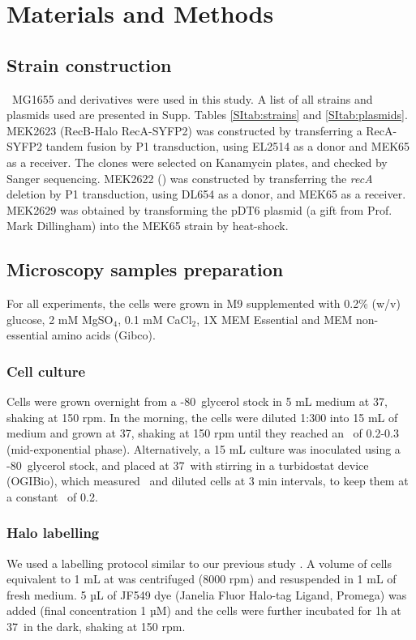 \section*{Materials and Methods}

\subsection*{Strain construction}
\ecoli\ MG1655 and derivatives were used in this study. A list of all strains and plasmids used are presented in Supp. Tables \ref{SItab:strains} and \ref{SItab:plasmids}.
MEK2623 (RecB-Halo RecA-SYFP2) was constructed by transferring a RecA-SYFP2 tandem fusion by P1 transduction, using EL2514 \cite{Wiktor2021} as a donor and MEK65 \cite{Lepore2019a} as a receiver. The clones were selected on Kanamycin plates, and checked by Sanger sequencing. MEK2622 (\dreca) was constructed by transferring the \emph{recA} deletion by P1 transduction, using DL654 as a donor, and MEK65 as a receiver. MEK2629 was obtained by transforming the pDT6 plasmid (a gift from Prof. Mark Dillingham) into the MEK65 strain by heat-shock.

\subsection*{Microscopy samples preparation}
For all experiments, the cells were grown in M9 supplemented with 0.2\% (w/v) glucose, 2 mM MgSO$_4$, 0.1 mM CaCl$_2$, 1X MEM Essential and MEM non-essential amino acids (Gibco).
\subsubsection*{Cell culture}
Cells were grown overnight from a -80\celsius\ glycerol stock in 5 mL medium at 37\celsius, shaking at 150 rpm. In the morning, the cells were diluted 1:300 into 15 mL of medium and grown at 37\celsius, shaking at 150 rpm until they reached an \od\ of 0.2-0.3 (mid-exponential phase).
Alternatively, a 15 mL culture was inoculated using a -80\celsius\ glycerol stock, and placed at 37\celsius\ with stirring in a turbidostat device (OGIBio), which measured \od\ and diluted cells at 3 min intervals, to keep them at a constant \od\ of 0.2.
\subsubsection*{Halo labelling}
We used a labelling protocol similar to our previous study \cite{Lepore2023}. A volume of cells equivalent to 1 mL at  was centrifuged (8000 rpm) and resuspended in 1 mL of fresh medium. 5 µL of JF549 dye (Janelia Fluor Halo-tag Ligand, Promega) was added (final concentration 1 µM) and the cells were further incubated for 1h at 37\celsius\ in the dark, shaking at 150 rpm.
